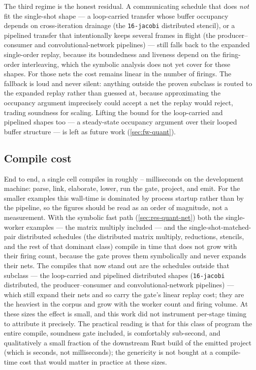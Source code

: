 The third regime is the honest residual. A communicating schedule that does \emph{not}
fit the single-shot shape --- a loop-carried transfer whose buffer occupancy depends on
cross-iteration drainage (the \texttt{16-jacobi} distributed stencil), or a pipelined
transfer that intentionally keeps several frames in flight (the producer--consumer and
convolutional-network pipelines) --- still falls back to the expanded single-order
replay, because its boundedness and liveness depend on the firing-order interleaving,
which the symbolic analysis does not yet cover for these shapes. For those nets the cost
remains linear in the number of firings. The fallback is loud and never silent: anything
outside the proven subclass is routed to the expanded replay rather than guessed at,
because approximating the occupancy argument imprecisely could accept a net the replay
would reject, trading soundness for scaling. Lifting the bound for the loop-carried and
pipelined shapes too --- a steady-state occupancy argument over their looped buffer
structure --- is left as future work (\cref{sec:fw-quant}).

\subsection{Compile cost}\label{sec:res-quant-time}

End to end, a single cell compiles in roughly \qtmin{}--\qtmax{} milliseconds on the
development machine: parse, link, elaborate, lower, run the gate, project, and emit.
For the smaller examples this wall-time is dominated by process startup rather than
by the pipeline, so the figures should be read as an order of magnitude, not a
measurement. With the symbolic fast path (\cref{sec:res-quant-net}) both the single-worker
examples --- the matrix multiply included --- and the single-shot-matched-pair distributed
schedules (the distributed matrix multiply, reductions, stencils, and the rest of that
dominant class) compile in time that does not grow with their firing count, because the
gate proves them symbolically and never expands their nets. The compiles that now stand
out are the schedules outside that subclass --- the loop-carried and pipelined
distributed shapes (\texttt{16-jacobi} distributed, the producer--consumer and
convolutional-network pipelines) --- which still expand their nets and so carry the gate's
linear replay cost; they are the heaviest in the corpus and grow with the worker count
and firing volume. At these sizes the effect is
small, and this work did not instrument per-stage timing to attribute it precisely. The
practical reading is that
for this class of program the entire compile, soundness gate included, is comfortably
sub-second, and qualitatively a small fraction of the downstream Rust build of the
emitted project (which is seconds, not milliseconds); the genericity is not bought at
a compile-time cost that would matter in practice at these sizes.
